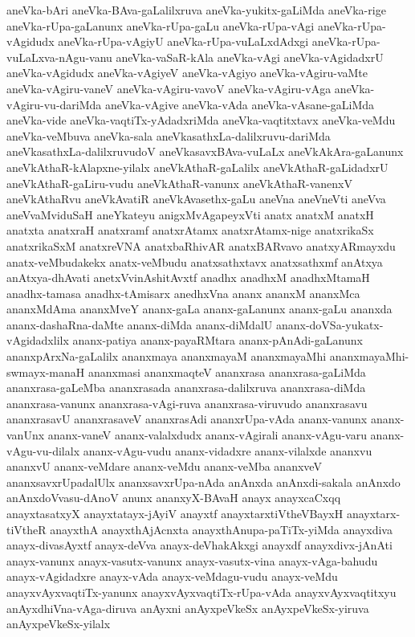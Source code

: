 {aneVka-bAri
aneVka-BAva-gaLalilxruva
aneVka-yukitx-gaLiMda
aneVka-rige
aneVka-rUpa-gaLanunx
aneVka-rUpa-gaLu
aneVka-rUpa-vAgi
aneVka-rUpa-vAgidudx
aneVka-rUpa-vAgiyU
aneVka-rUpa-vuLaLxdAdxgi
aneVka-rUpa-vuLaLxva-nAgu-vanu
aneVka-vaSaR-kAla
aneVka-vAgi
aneVka-vAgidadxrU
aneVka-vAgidudx
aneVka-vAgiyeV
aneVka-vAgiyo
aneVka-vAgiru-vaMte
aneVka-vAgiru-vaneV
aneVka-vAgiru-vavoV
aneVka-vAgiru-vAga
aneVka-vAgiru-vu-dariMda
aneVka-vAgive
aneVka-vAda
aneVka-vAsane-gaLiMda
aneVka-vide
aneVka-vaqtiTx-yAdadxriMda
aneVka-vaqtitxtavx
aneVka-veMdu
aneVka-veMbuva
aneVka-sala
aneVkasathxLa-dalilxruvu-dariMda
aneVkasathxLa-dalilxruvudoV
aneVkasavxBAva-vuLaLx
aneVkAkAra-gaLanunx
aneVkAthaR-kAlapxne-yilalx
aneVkAthaR-gaLalilx
aneVkAthaR-gaLidadxrU
aneVkAthaR-gaLiru-vudu
aneVkAthaR-vanunx
aneVkAthaR-vanenxV
aneVkAthaRvu
aneVkAvatiR
aneVkAvasethx-gaLu
aneVna
aneVneVti
aneVva
aneVvaMviduSaH
aneYkateyu
anigxMvAgapeyxVti
anatx
anatxM
anatxH
anatxta
anatxraH
anatxramf
anatxrAtamx
anatxrAtamx-nige
anatxrikaSx
anatxrikaSxM
anatxreVNA
anatxbaRhivAR
anatxBARvavo
anatxyARmayxdu
anatx-veMbudakekx
anatx-veMbudu
anatxsathxtavx
anatxsathxmf
anAtxya
anAtxya-dhAvati
anetxVvinAshitAvxtf
anadhx
anadhxM
anadhxMtamaH
anadhx-tamasa
anadhx-tAmisarx
anedhxVna
ananx
ananxM
ananxMca
ananxMdAma
ananxMveY
ananx-gaLa
ananx-gaLanunx
ananx-gaLu
ananxda
ananx-dashaRna-daMte
ananx-diMda
ananx-diMdalU
ananx-doVSa-yukatx-vAgidadxlilx
ananx-patiya
ananx-payaRMtara
ananx-pAnAdi-gaLanunx
ananxpArxNa-gaLalilx
ananxmaya
ananxmayaM
ananxmayaMhi
ananxmayaMhi-swmayx-manaH
ananxmasi
ananxmaqteV
ananxrasa
ananxrasa-gaLiMda
ananxrasa-gaLeMba
ananxrasada
ananxrasa-dalilxruva
ananxrasa-diMda
ananxrasa-vanunx
ananxrasa-vAgi-ruva
ananxrasa-viruvudo
ananxrasavu
ananxrasavU
ananxrasaveV
ananxrasAdi
ananxrUpa-vAda
ananx-vanunx
ananx-vanUnx
ananx-vaneV
ananx-valalxdudx
ananx-vAgirali
ananx-vAgu-varu
ananx-vAgu-vu-dilalx
ananx-vAgu-vudu
ananx-vidadxre
ananx-vilalxde
ananxvu
ananxvU
ananx-veMdare
ananx-veMdu
ananx-veMba
ananxveV
ananxsavxrUpadalUlx
ananxsavxrUpa-nAda
anAnxda
anAnxdi-sakala
anAnxdo
anAnxdoVvasu-dAnoV
anunx
ananxyX-BAvaH
anayx
anayxcaCxqq
anayxtasatxyX
anayxtatayx-jAyiV
anayxtf
anayxtarxtiVtheVBayxH
anayxtarx-tiVtheR
anayxthA
anayxthAjAcnxta
anayxthAnupa-paTiTx-yiMda
anayxdiva
anayx-divasAyxtf
anayx-deVva
anayx-deVhakAkxgi
anayxdf
anayxdivx-jAnAti
anayx-vanunx
anayx-vasutx-vanunx
anayx-vasutx-vina
anayx-vAga-bahudu
anayx-vAgidadxre
anayx-vAda
anayx-veMdagu-vudu
anayx-veMdu
anayxvAyxvaqtiTx-yanunx
anayxvAyxvaqtiTx-rUpa-vAda
anayxvAyxvaqtitxyu
anAyxdhiVna-vAga-diruva
anAyxni
anAyxpeVkeSx
anAyxpeVkeSx-yiruva
anAyxpeVkeSx-yilalx
}
